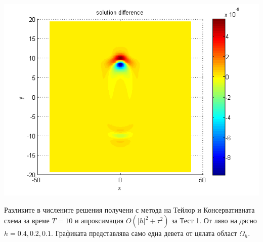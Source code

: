 \documentclass{beamer}
\begin{document}
\begin{frame}
\begin{center}
	\begin{minipage}[b]{0.32\linewidth}
		\includegraphics[width=\linewidth]{../amitans/figures/compare_128_bt1_c09_h010.png}		 
	\end{minipage}
\end{center}
Разликите в числените решения получени с метода на Тейлор и Консервативната схема за време $T=10$ и апроксимация $O(|h|^2 + \tau^2)$ за Тест 1. От ляво на дясно $h=0.4, 0.2, 0.1$. Графиката представлява само една девета от цялата област $\Omega_h$.
\end{frame}

\end{document}
